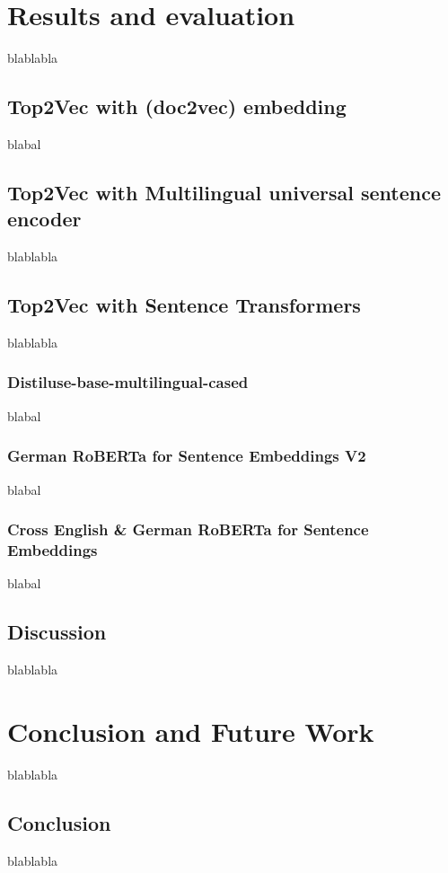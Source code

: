 \documentclass[fontsize=12pt,a4paper,twoside,openany]{scrbook}
\begin{document}
\chapter{Results and evaluation}

blablabla

\section{Top2Vec with (doc2vec) embedding}
\label{sec:doc2vec_results}
blabal

\section{Top2Vec with Multilingual universal sentence encoder}
\label{sec:muse_results}

blablabla

\section{Top2Vec with Sentence Transformers}
\label{sec:senttrans_results}
blablabla


\subsection{Distiluse-base-multilingual-cased}
\label{sec:muse_result}
blabal


\subsection{German RoBERTa for Sentence Embeddings V2}
\label{sec:roberta_de_result}
blabal

\subsection{Cross English \& German RoBERTa for Sentence Embeddings}
\label{sec:roberta_de_en_result}
blabal

\section{Discussion}
\label{sec:discussion}
blablabla


\chapter{Conclusion and Future Work}
blablabla

\section{Conclusion}
blablabla
\end{document}
